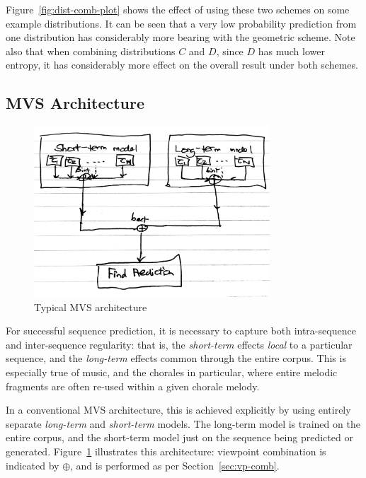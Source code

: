 \documentclass[12pt,a4paper,twoside,openright]{report}
\begin{document}
Figure~\ref{fig:dist-comb-plot} shows the effect of using these two schemes on
some example distributions. It can be seen that a very low probability
prediction from one distribution has considerably more bearing with the
geometric scheme. Note also that when combining distributions $C$ and $D$, since
$D$ has much lower entropy, it has considerably more effect on the overall
result under both schemes.

\subsection{MVS Architecture}\label{sec:mvs-arch}

\begin{figure}[H]
\centering
\includegraphics[width=250pt]{figs/mvs_arch_tmp.jpg}
\caption{Typical MVS architecture}
\label{fig:mvs-arch}
\end{figure}

For successful sequence prediction, it is necessary to capture both
intra-sequence and inter-sequence regularity: that is, the \emph{short-term}
effects \emph{local} to a particular sequence, and the \emph{long-term} effects
common through the entire corpus.  This is especially true of music, and the
chorales in particular, where entire melodic fragments are often re-used within
a given chorale melody.

In a conventional MVS architecture, this is achieved explicitly by using
entirely separate \emph{long-term} and \emph{short-term} models. The long-term
model is trained on the entire corpus, and the short-term model just on the
sequence being predicted or generated. Figure~\ref{fig:mvs-arch} illustrates
this architecture: viewpoint combination is indicated by $\oplus$, and is
performed as per Section~\ref{sec:vp-comb}.
\end{document}

